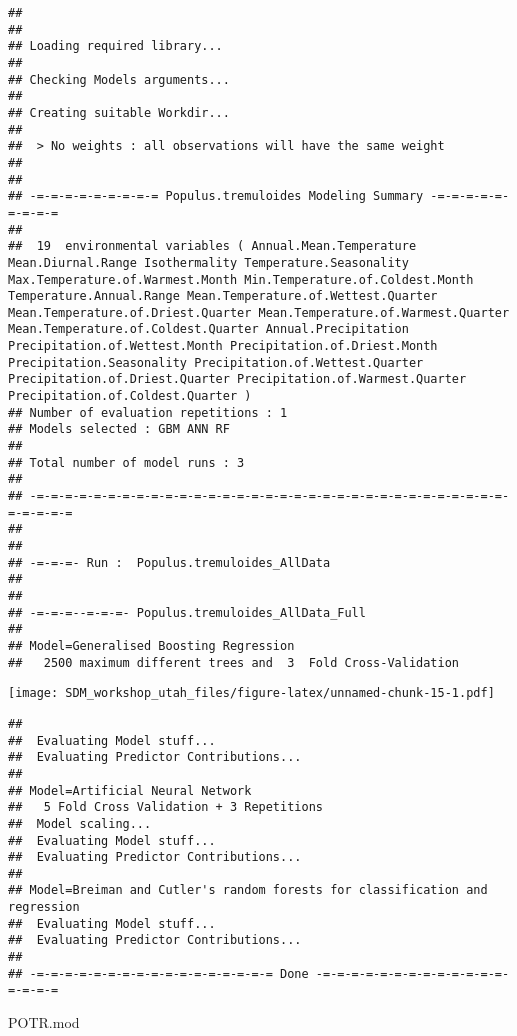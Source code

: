 \documentclass[]{article}
\newenvironment{Shaded}{\begin{snugshade}}{\end{snugshade}}
\newcommand{\NormalTok}[1]{#1}
\begin{document}
\begin{verbatim}
## 
## 
## Loading required library...
## 
## Checking Models arguments...
## 
## Creating suitable Workdir...
## 
##  > No weights : all observations will have the same weight
## 
## 
## -=-=-=-=-=-=-=-=-= Populus.tremuloides Modeling Summary -=-=-=-=-=-=-=-=-=
## 
##  19  environmental variables ( Annual.Mean.Temperature Mean.Diurnal.Range Isothermality Temperature.Seasonality Max.Temperature.of.Warmest.Month Min.Temperature.of.Coldest.Month Temperature.Annual.Range Mean.Temperature.of.Wettest.Quarter Mean.Temperature.of.Driest.Quarter Mean.Temperature.of.Warmest.Quarter Mean.Temperature.of.Coldest.Quarter Annual.Precipitation Precipitation.of.Wettest.Month Precipitation.of.Driest.Month Precipitation.Seasonality Precipitation.of.Wettest.Quarter Precipitation.of.Driest.Quarter Precipitation.of.Warmest.Quarter Precipitation.of.Coldest.Quarter )
## Number of evaluation repetitions : 1
## Models selected : GBM ANN RF 
## 
## Total number of model runs : 3 
## 
## -=-=-=-=-=-=-=-=-=-=-=-=-=-=-=-=-=-=-=-=-=-=-=-=-=-=-=-=-=-=-=-=-=-=-=-=-=-=
## 
## 
## -=-=-=- Run :  Populus.tremuloides_AllData 
## 
## 
## -=-=-=--=-=-=- Populus.tremuloides_AllData_Full 
## 
## Model=Generalised Boosting Regression 
##   2500 maximum different trees and  3  Fold Cross-Validation
\end{verbatim}

\texttt{[image: SDM\_workshop\_utah\_files/figure-latex/unnamed-chunk-15-1.pdf]}

\begin{verbatim}
## 
##  Evaluating Model stuff...
##  Evaluating Predictor Contributions... 
## 
## Model=Artificial Neural Network 
##   5 Fold Cross Validation + 3 Repetitions
##  Model scaling...
##  Evaluating Model stuff...
##  Evaluating Predictor Contributions... 
## 
## Model=Breiman and Cutler's random forests for classification and regression
##  Evaluating Model stuff...
##  Evaluating Predictor Contributions... 
## 
## -=-=-=-=-=-=-=-=-=-=-=-=-=-=-=-=-= Done -=-=-=-=-=-=-=-=-=-=-=-=-=-=-=-=-=
\end{verbatim}

\begin{Shaded}
\begin{Highlighting}[]
\NormalTok{POTR.mod}
\end{Highlighting}
\end{Shaded}
\end{document}
